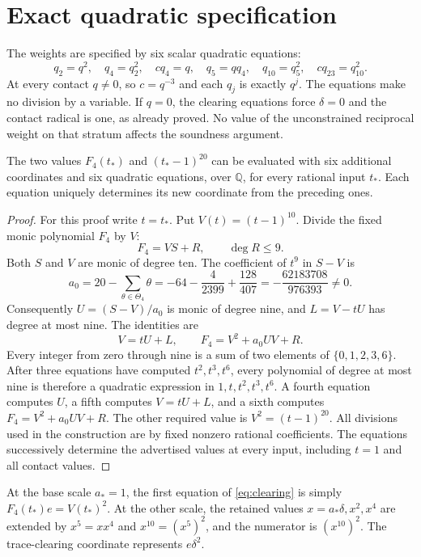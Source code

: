 \documentclass[11pt,a4paper]{article}
\newcommand{\Q}{\mathbb Q}\newcommand{\Z}{\mathbb Z}\newcommand{\HH}{\mathcal H}
\begin{document}
\section{Exact quadratic specification}
The weights are specified by six scalar quadratic equations:
\[
 q_2=q^2,\quad q_4=q_2^2,\quad c q_4=q,\quad
 q_5=qq_4,\quad q_{10}=q_5^2,\quad c q_{23}=q_{10}^2.
\]
At every contact $q\ne0$, so $c=q^{-3}$ and each $q_j$ is exactly
$q^j$. The equations make no division by a variable. If $q=0$, the
clearing equations force $\delta=0$ and the contact radical is one,
as already proved. No value of the unconstrained reciprocal weight
on that stratum affects the soundness argument.

\begin{lemma}\label{lem:contactcircuit}
The two values $F_4(t_*)$ and $(t_*-1)^{20}$ can be evaluated with
six additional coordinates and six quadratic equations, over $\Q$,
for every rational input $t_*$. Each equation uniquely determines its
new coordinate from the preceding ones.
\end{lemma}
\begin{proof}
For this proof write $t=t_*$. Put $V(t)=(t-1)^{10}$. Divide the fixed
monic polynomial $F_4$ by $V$:
\[
 F_4=VS+R,\qquad \deg R\le9.
\]
Both $S$ and $V$ are monic of degree ten. The coefficient of $t^9$
in $S-V$ is
\[
 a_0=20-\sum_{\theta\in\Theta_4}\theta
     =-64-\frac4{2399}+\frac{128}{407}
     =-\frac{62183708}{976393}\ne0.
\]
Consequently $U=(S-V)/a_0$ is monic of degree nine, and
$L=V-tU$ has degree at most nine. The identities are
\[
              V=tU+L,\qquad F_4=V^2+a_0UV+R.
\]
Every integer from zero through nine is a sum of two elements of
$\{0,1,2,3,6\}$. After three equations have computed
$t^2,t^3,t^6$, every polynomial of degree at most nine is therefore
a quadratic expression in $1,t,t^2,t^3,t^6$. A fourth equation
computes $U$, a fifth computes $V=tU+L$, and a sixth computes
$F_4=V^2+a_0UV+R$. The other required value is $V^2=(t-1)^{20}$.
All divisions used in the construction are by fixed nonzero rational
coefficients. The equations successively determine the advertised
values at every input, including $t=1$ and all contact values.
\end{proof}

At the base scale $a_*=1$, the first equation of
\eqref{eq:clearing} is simply $F_4(t_*)e=V(t_*)^2$.
At the other scale, the retained values $x=a_*\delta,x^2,x^4$
are extended by $x^5=xx^4$ and $x^{10}=(x^5)^2$, and the numerator
is $(x^{10})^2$. The trace-clearing coordinate represents $e\delta^2$.
\end{document}
